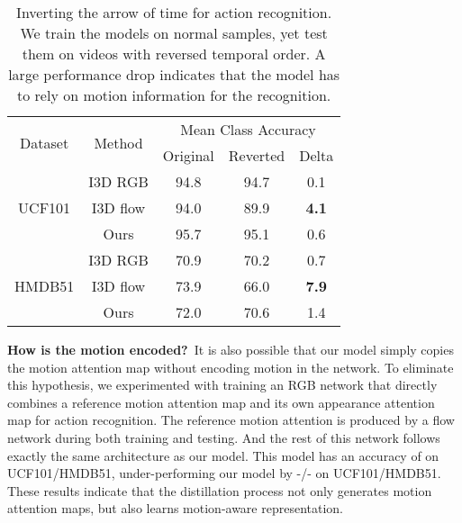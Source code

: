 \documentclass{bmvc2k}
\newcommand{\tablestyle}[2]{\setlength{\tabcolsep}{#1}\renewcommand{\arraystretch}{#2}\centering\footnotesize}
\begin{document}
\begin{table}[t]
\centering
\tablestyle{2pt}{1.0}
\setlength{\tabcolsep}{5pt} \renewcommand{\arraystretch}{1} \footnotesize
\begin{tabular}{c|c|ccc}
\multirow{2}{*}{Dataset}        & \multirow{2}{*}{Method}   & \multicolumn{3}{c}{Mean Class Accuracy} \\
    &                           & Original   & Reverted &  Delta \\ \hline 

\multirow{3}{*}{UCF101}         & I3D RGB  & 94.8 & 94.7     & 0.1  \\
                                & I3D flow & 94.0 & 89.9     & \textbf{4.1}  \\ 
                                & Ours     & 95.7 & 95.1     & 0.6   \\  \hline
\multirow{3}{*}{HMDB51}         & I3D RGB  & 70.9 & 70.2     & 0.7  \\
                                & I3D flow & 73.9 & 66.0     & \textbf{7.9} \\ 
                                & Ours     & 72.0 & 70.6     & 1.4  \\
\end{tabular}
\vspace{0.1em}
\caption{Inverting the arrow of time for action recognition. We train the models on normal samples, yet test them on videos with reversed temporal order. A large performance drop indicates that the model has to rely on motion information for the recognition.\vspace{-1.6em}}
\label{table:arrow}
\end{table}

\noindent \textbf{How is the motion encoded?}\ It is also possible that our model simply copies the motion attention map without encoding motion in the network. To eliminate this hypothesis, we experimented with training an RGB network that directly combines a reference motion attention map and its own appearance attention map for action recognition. The reference motion attention is produced by a flow network during both training and testing. And the rest of this network follows exactly the same architecture as our model. This model has an accuracy of  on UCF101/HMDB51, under-performing our model by -/- on UCF101/HMDB51. These results indicate that the distillation process not only generates motion attention maps, but also learns motion-aware representation.\\
\end{document}
